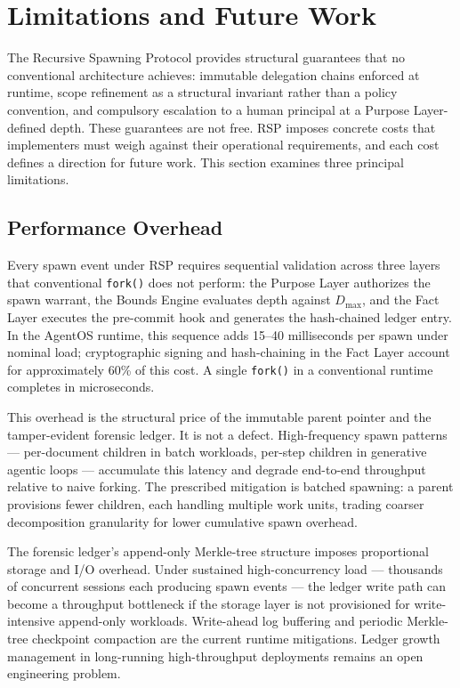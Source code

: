 \section{Limitations and Future Work}
\label{sec:rs-limitations}

The Recursive Spawning Protocol provides structural guarantees that no conventional architecture achieves: immutable delegation chains enforced at runtime, scope refinement as a structural invariant rather than a policy convention, and compulsory escalation to a human principal at a Purpose Layer-defined depth. These guarantees are not free. RSP imposes concrete costs that implementers must weigh against their operational requirements, and each cost defines a direction for future work. This section examines three principal limitations.

\subsection{Performance Overhead}
\label{sec:rs-perf-overhead}

Every spawn event under RSP requires sequential validation across three layers that conventional \texttt{fork()} does not perform: the Purpose Layer authorizes the spawn warrant, the Bounds Engine evaluates depth against $D_{\max}$, and the Fact Layer executes the pre-commit hook and generates the hash-chained ledger entry. In the AgentOS runtime, this sequence adds \numrange{15}{40} milliseconds per spawn under nominal load; cryptographic signing and hash-chaining in the Fact Layer account for approximately 60\% of this cost. A single \texttt{fork()} in a conventional runtime completes in microseconds.

This overhead is the structural price of the immutable parent pointer and the tamper-evident forensic ledger. It is not a defect. High-frequency spawn patterns — per-document children in batch workloads, per-step children in generative agentic loops — accumulate this latency and degrade end-to-end throughput relative to naive forking. The prescribed mitigation is batched spawning: a parent provisions fewer children, each handling multiple work units, trading coarser decomposition granularity for lower cumulative spawn overhead.

The forensic ledger's append-only Merkle-tree structure imposes proportional storage and I/O overhead. Under sustained high-concurrency load — thousands of concurrent sessions each producing spawn events — the ledger write path can become a throughput bottleneck if the storage layer is not provisioned for write-intensive append-only workloads. Write-ahead log buffering and periodic Merkle-tree checkpoint compaction are the current runtime mitigations. Ledger growth management in long-running high-throughput deployments remains an open engineering problem.

